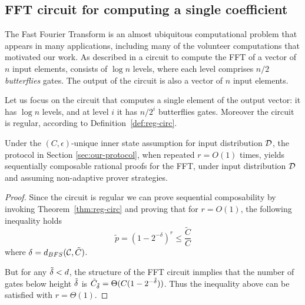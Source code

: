 
\subsection{FFT circuit for computing a single coefficient}

The Fast Fourier Transform is an almost ubiquitous computational problem that appears in many applications, including many of the volunteer 
computations that motivated our work. As described in \cite{CLRS} a circuit to compute the FFT of a vector of $n$ input elements, consists of $\log n$ levels, 
where each level comprises $n/2$ {\em butterflies} gates. The output of the circuit is also a vector of $n$ input elements. 

Let us focus on the circuit that computes a single element of the output vector: it has $\log n$ levels, and at level $i$ it has $n/2^i$ butterflies gates. 
Moreover the circuit is regular, according to Definition~\ref{def:reg-circ}.


\begin{theorem}
Under the $(C,\epsilon)$-unique inner state assumption for input distribution $\cal D$,
the protocol in Section \ref{sec:our-protocol}, when repeated $r = O(1)$ times, yields sequentially composable rational proofs for the FFT, under input 
distribution $\cal D$ and assuming non-adaptive prover strategies. 
\end{theorem}
\begin{proof}
Since the circuit is regular we can prove sequential composability by invoking Theorem~\ref{thm:reg-circ} and proving that for $r = O(1)$, 
the following inequality holds 
$$ \tilde{p} = (1-2^{-\delta})^r \leq \frac{\tilde{C}}{C} $$
where $\delta=d_{BFS}({\cal C},\tilde{C})$.

But for any $\tilde{\delta} < d$, the structure of the FFT circuit inmplies that the number of gates below height $\tilde{\delta}$ is $\tilde{C}_{\tilde{\delta}} = \Theta(C(1-2^{-\tilde{\delta}}))$.
Thus the inequality above can be satisfied with $r = \Theta(1)$.
\end{proof}	



